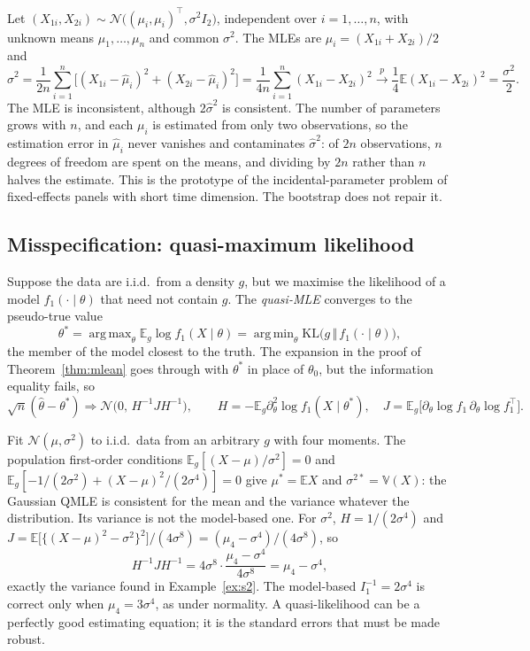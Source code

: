 \documentclass[11pt,a4paper]{article}
\newcommand{\E}{\mathbb{E}}
\newcommand{\V}{\mathbb{V}}
\newcommand{\N}{\mathcal{N}}
\newcommand{\cp}{\xrightarrow{\;p\;}}
\newcommand{\cd}{\Rightarrow}
\newcommand{\iid}{i.i.d.}
\DeclareMathOperator*{\argmax}{arg\,max}
\DeclareMathOperator*{\argmin}{arg\,min}
\begin{document}
\begin{example}
Let $(X_{1i},X_{2i})\sim\N\big((\mu_i,\mu_i)^\top,\sigma^2I_2\big)$, independent over $i=1,\ldots,n$, with unknown means $\mu_1,\ldots,\mu_n$ and common $\sigma^2$. The MLEs are $\hat\mu_i=(X_{1i}+X_{2i})/2$ and
\[
\hat\sigma^2=\frac{1}{2n}\sum_{i=1}^n\big[(X_{1i}-\hat\mu_i)^2+(X_{2i}-\hat\mu_i)^2\big]=\frac{1}{4n}\sum_{i=1}^n(X_{1i}-X_{2i})^2\cp\frac14\E(X_{1i}-X_{2i})^2=\frac{\sigma^2}{2}.
\]
The MLE is inconsistent, although $2\hat\sigma^2$ is consistent. The number of parameters grows with $n$, and each $\mu_i$ is estimated from only two observations, so the estimation error in $\hat\mu_i$ never vanishes and contaminates $\hat\sigma^2$: of $2n$ observations, $n$ degrees of freedom are spent on the means, and dividing by $2n$ rather than $n$ halves the estimate. This is the prototype of the incidental-parameter problem of fixed-effects panels with short time dimension. The bootstrap does not repair it.
\end{example}

\subsection{Misspecification: quasi-maximum likelihood}\label{sec:qmle}

Suppose the data are \iid\ from a density $g$, but we maximise the likelihood of a model $f_1(\cdot\mid\theta)$ that need not contain $g$. The \emph{quasi-MLE} converges to the pseudo-true value
\[
\theta^*=\argmax_\theta\E_g\log f_1(X\mid\theta)=\argmin_\theta\mathrm{KL}\big(g\,\Vert\,f_1(\cdot\mid\theta)\big),
\]
the member of the model closest to the truth. The expansion in the proof of Theorem~\ref{thm:mlean} goes through with $\theta^*$ in place of $\theta_0$, but the information equality fails, so
\[
\sqrt n(\hat\theta-\theta^*)\cd\N\big(0,\,H^{-1}JH^{-1}\big),\qquad H=-\E_g\partial^2_\theta\log f_1(X\mid\theta^*),\quad J=\E_g\big[\partial_\theta\log f_1\,\partial_\theta\log f_1^\top\big].
\]

\begin{example}
Fit $\N(\mu,\sigma^2)$ to \iid\ data from an arbitrary $g$ with four moments. The population first-order conditions $\E_g[(X-\mu)/\sigma^2]=0$ and $\E_g[-1/(2\sigma^2)+(X-\mu)^2/(2\sigma^4)]=0$ give $\mu^*=\E X$ and $\sigma^{2*}=\V(X)$: the Gaussian QMLE is consistent for the mean and the variance whatever the distribution. Its variance is not the model-based one. For $\sigma^2$, $H=1/(2\sigma^4)$ and $J=\E\big[\{(X-\mu)^2-\sigma^2\}^2\big]/(4\sigma^8)=(\mu_4-\sigma^4)/(4\sigma^8)$, so
\[
H^{-1}JH^{-1}=4\sigma^8\cdot\frac{\mu_4-\sigma^4}{4\sigma^8}=\mu_4-\sigma^4,
\]
exactly the variance found in Example~\ref{ex:s2}. The model-based $I_1^{-1}=2\sigma^4$ is correct only when $\mu_4=3\sigma^4$, as under normality. A quasi-likelihood can be a perfectly good estimating equation; it is the standard errors that must be made robust.
\end{example}
\end{document}
